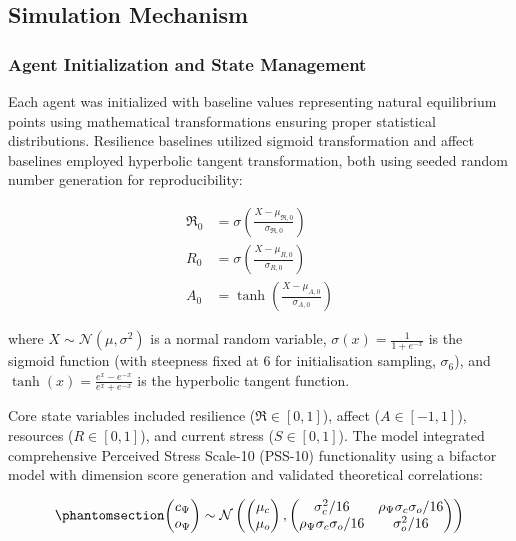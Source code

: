\documentclass[
  letterpaper,
  DIV=11,
  numbers=noendperiod]{scrartcl}
\begin{document}
\subsection{Simulation Mechanism}\label{simulation-mechanism}

\subsubsection{Agent Initialization and State
Management}\label{agent-initialization-and-state-management}

Each agent was initialized with baseline values representing natural
equilibrium points using mathematical transformations ensuring proper
statistical distributions. Resilience baselines utilized sigmoid
transformation and affect baselines employed hyperbolic tangent
transformation, both using seeded random number generation for
reproducibility:

\begin{align*}
\mathfrak{R}_{\text{0}} &= \sigma\left(\frac{X - \mu_{\mathfrak{R},\text{0}}}{\sigma_{\mathfrak{R},\text{0}}}\right) \\
R_{\text{0}} &= \sigma\left(\frac{X - \mu_{R,\text{0}}}{\sigma_{R,\text{0}}}\right) \\
A_{\text{0}} &= \tanh\left(\frac{X - \mu_{A,\text{0}}}{\sigma_{A,\text{0}}}\right)
\end{align*} \label{eq-baseline-transformations}

where \(X \sim \mathcal{N}(\mu, \sigma^2)\) is a normal random variable,
\(\sigma(x) = \frac{1}{1+e^{-x}}\) is the sigmoid function (with
steepness fixed at 6 for initialisation sampling, \(\sigma_6\)), and
\(\tanh(x) = \frac{e^x - e^{-x}}{e^x + e^{-x}}\) is the hyperbolic
tangent function.

Core state variables included resilience (\(\mathfrak{R} \in [0,1]\)),
affect (\(A \in [-1,1]\)), resources (\(R \in [0,1]\)), and current
stress (\(S \in [0,1]\)). The model integrated comprehensive Perceived
Stress Scale-10 (PSS-10) functionality using a bifactor model with
dimension score generation and validated theoretical correlations:

\begin{equation}\phantomsection\label{eq-pss10-dimension-score}{
\begin{pmatrix}
c_\Psi \\ o_\Psi
\end{pmatrix}
\sim
\mathcal{N}\left(
\begin{pmatrix}
\mu_c \\ \mu_o
\end{pmatrix},
\begin{pmatrix}
\sigma_c^2/16 & \rho_\Psi \sigma_c \sigma_o/16 \\
\rho_\Psi \sigma_c \sigma_o/16 & \sigma_o^2/16
\end{pmatrix}
\right)
}\end{equation}
\end{document}
